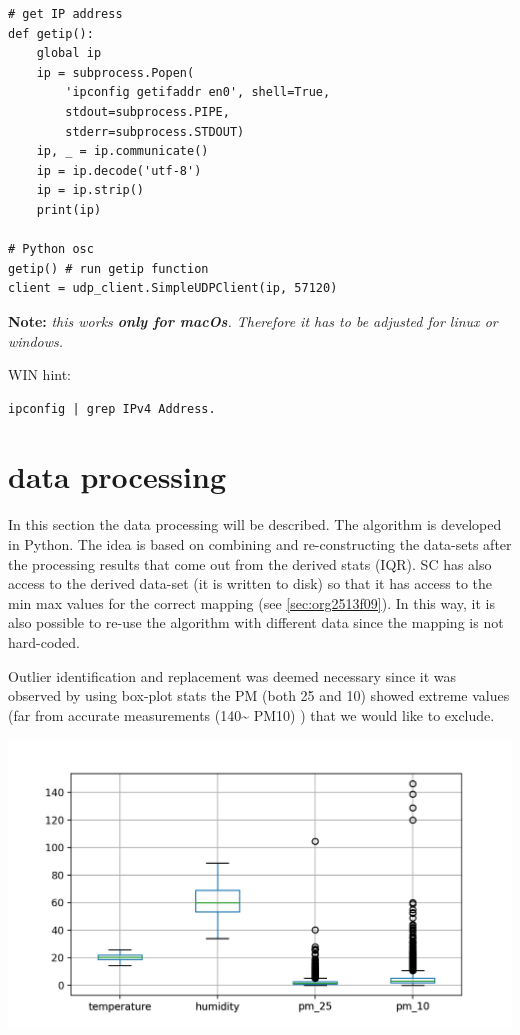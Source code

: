 \documentclass[11pt]{article}
\begin{document}
\begin{verbatim}
# get IP address
def getip():
    global ip
    ip = subprocess.Popen(
        'ipconfig getifaddr en0', shell=True,
        stdout=subprocess.PIPE,
        stderr=subprocess.STDOUT)
    ip, _ = ip.communicate()
    ip = ip.decode('utf-8')
    ip = ip.strip()
    print(ip)

# Python osc
getip() # run getip function
client = udp_client.SimpleUDPClient(ip, 57120)
\end{verbatim}
\textbf{Note:} \emph{this works \textbf{only for macOs}.  Therefore it has to be adjusted for linux or windows.}

\vspace{0.2cm}
\noindent
WIN hint:
\begin{verbatim}
ipconfig | grep IPv4 Address.
\end{verbatim}

\section{data processing}
\label{sec:orgda9ec3e}
In this section the data processing will be described.  The algorithm is developed in Python.  The idea is based on combining and re-constructing the data-sets after the processing results that come out from the derived stats (IQR).  SC has also access to the derived data-set (it is written to disk) so that it has access to the min max values for the correct mapping (see \ref{sec:org2513f09}).  In this way, it is also possible to re-use the algorithm with different data since the mapping is not hard-coded.

Outlier identification and replacement was deemed necessary since it was observed by using box-plot stats the PM (both 25 and 10) showed extreme values (far from accurate measurements (140\textasciitilde{} PM10) ) that we would like to exclude.

\begin{center}
\includegraphics[width=.9\linewidth]{./boxplot.png}
\end{center}
\end{document}
